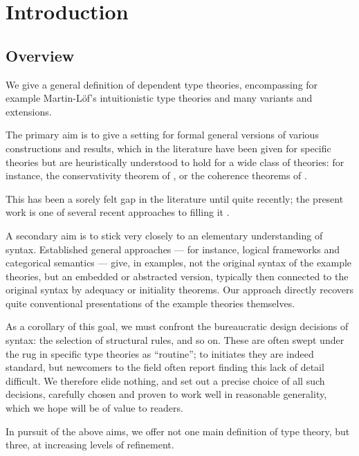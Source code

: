 
\section{Introduction}

\subsection{Overview}

  We give a general definition of dependent type theories,
  encompassing for example Martin-Löf’s intuitionistic type theories and many variants and extensions.

  The primary aim is to give a setting for formal general versions of various constructions and results,
  which in the literature have been given for specific theories but are heuristically understood to hold for a wide class of theories:
  for instance, the conservativity theorem of \citep{hofmann:syntax-and-semantics}, or the coherence theorems of \citep{hofmann:lcccs,lumsdaine-warren:local-universes}.
  
  This has been a sorely felt gap in the literature until quite recently;
  the present work is one of several recent approaches to filling it
  \citep{isaev17:_algeb,uemura19:_gener_framew_seman_type_theor,brunerie:_agda}.
  
  A secondary aim is to stick very closely to an elementary understanding of syntax.
  Established general approaches --- for instance, logical frameworks and categorical semantics --- give, in examples, not the original syntax of the example theories, but an embedded or abstracted version, typically then connected to the original syntax by adequacy or initiality theorems.
  Our approach directly recovers quite conventional presentations of the example theories themselves.
  
  As a corollary of this goal, we must confront the bureaucratic design decisions of syntax: the selection of structural rules, and so on.
  These are often swept under the rug in specific type theories as “routine”; to initiates they are indeed standard, but newcomers to the field often report finding this lack of detail difficult.
  We therefore elide nothing, and set out a precise choice of all such decisions, carefully chosen and proven to work well in reasonable generality, which we hope will be of value to readers.

  In pursuit of the above aims, we offer not one main definition of type theory, but three, at increasing levels of refinement.
  
